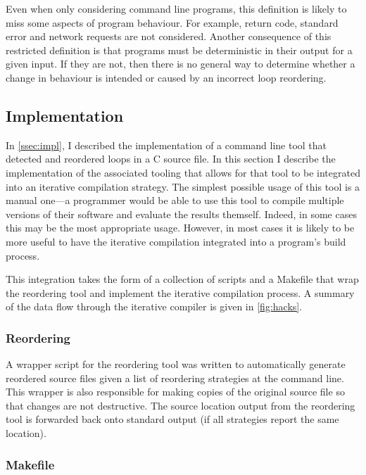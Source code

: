 \documentclass[journal]{IEEEtran}
\begin{document}
Even when only considering command line programs, this definition is likely to
miss some aspects of program behaviour. For example, return code, standard error
and network requests are not considered. Another consequence of this restricted
definition is that programs must be deterministic in their output for a given
input. If they are not, then there is no general way to determine whether a
change in behaviour is intended or caused by an incorrect loop reordering.

\subsection{Implementation}

In \autoref{ssec:impl}, I described the implementation of a command line tool
that detected and reordered loops in a C source file. In this section I describe
the implementation of the associated tooling that allows for that tool to be
integrated into an iterative compilation strategy. The simplest possible usage
of this tool is a manual one---a programmer would be able to use this tool to
compile multiple versions of their software and evaluate the results themself.
Indeed, in some cases this may be the most appropriate usage. However, in most
cases it is likely to be more useful to have the iterative compilation
integrated into a program's build process.

This integration takes the form of a collection of scripts and a Makefile that
wrap the reordering tool and implement the iterative compilation process. A
summary of the data flow through the iterative compiler is given in
\autoref{fig:hacks}.

\subsubsection{Reordering}

A wrapper script for the reordering tool was written to automatically generate
reordered source files given a list of reordering strategies at the command
line. This wrapper is also responsible for making copies of the original source
file so that changes are not destructive. The source location output from the
reordering tool is forwarded back onto standard output (if all strategies report
the same location).

\subsubsection{Makefile}
\end{document}

